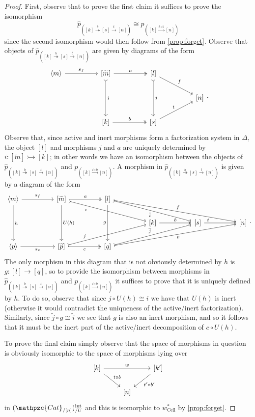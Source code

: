 \documentclass[a4paper, reqno]{amsart}
\theoremstyle{definition}
\newcommand\ccat{\mathpzc{Cat}}
\newcommand\cell{\mathrm{Cell}}
\newcommand\bm{\langle m\rangle}
\newcommand\inrt{\mathrm{int}}
\begin{document}
\begin{proof}
First, observe that to prove the first claim it suffices to prove the isomorphism \[\widehat{p}_{([k]\overset{b}{\twoheadrightarrow}[s]\xrightarrow{t}[n])}\cong p_{([k]\xrightarrow{t\circ b}[n])}\]
since the second isomorphism would then follow from \cref{prop:forget}. Observe that objects of $\widehat{p}_{([k]\overset{b}{\twoheadrightarrow}[s]\xrightarrow{t}[n])}$ are given by diagrams of the form
\[
\begin{tikzcd}[column sep=huge]
\bm\arrow[r, "s_f"]&{[\widetilde{m}]}\arrow[r, two heads, "a"]\arrow[dd, tail, "i"]&{[l]}\arrow[dd, tail, "j"]\arrow[dr, "f"]\\
{}&{}&{}&{[n]}\\
{}&{[k]}\arrow[r, two heads, "b"]&{[s]}\arrow[ur, "t"]
\end{tikzcd}.
\]
Observe that, since active and inert morphisms form a factorization system in $\Delta$,   the object $[l]$ and morphisms $j$ and $a$ are uniquely determined by $i:[\widetilde{m}]\rightarrowtail[k]$; in other words we have an isomorphism between the objects of $\widehat{p}_{([k]\overset{b}{\twoheadrightarrow}[s]\xrightarrow{t}[n])}$ and $p_{([k]\xrightarrow{t\circ b}[n])}$. A morphism in $\widehat{p}_{([k]\overset{b}{\twoheadrightarrow}[s]\xrightarrow{t}[n])}$ is given by a diagram of the form
\[
\begin{tikzcd}[column sep=huge]
\bm\arrow[dd, "h"]\arrow[r, "s_f"]&{[\widetilde{m}]}\arrow[dd, "U(h)"]\arrow[drr, tail, "i" near start, swap]\arrow[r, two heads, "a"]&{[l]}\arrow[dd, "g" swap]\arrow[drr, tail, "\overline{i}" swap]\arrow[drrr, "f"]\\
{}&{}&{}&{[k]}\arrow[r, two heads, "b"]&{[s]}\arrow[r, "t" very near start]&{[n]}\\
\langle p\rangle\arrow[r, "s_v" swap]&{[\widetilde{p}]}\arrow[r, two heads, "c" swap]\arrow[urr, tail, "j" near start]&{[q]}\arrow[urr,tail, "\overline{j}"]\arrow[urrr, "v" swap]
\end{tikzcd}.
\]
The only morphism in this diagram that is not obviously determined by $h$ is $g:[l]\rightarrow[q]$, so to provide the isomorphism between morphisms in $\widehat{p}_{([k]\overset{b}{\twoheadrightarrow}[s]\xrightarrow{t}[n])}$ and $p_{([k]\xrightarrow{t\circ b}[n])}$ it suffices to prove that it is uniquely defined by $h$. To do so, observe that since $j\circ U(h)\cong i$ we have that $U(h)$ is inert (otherwise it would contradict the uniqueness of the active/inert factorization). Similarly, since $\widetilde{j}\circ g\cong \widetilde{i}$ we see that $g$ is also an inert morphism, and so it follows that it must be the inert part of the active/inert decomposition of $c\circ U(h)$.\par
To prove the final claim simply observe that the space of morphisms in question is obviously isomorphic to the space of morphisms lying over 
\[
\begin{tikzcd}
{[k]}\arrow[rr, "w"]\arrow[rd, "t\circ b"]&{}&{[k']}\arrow[ld, "t'\circ b'"]\\
{}&{[n]}
\end{tikzcd}
\]
in $(\ccat_{/[n]})^\inrt_{/U}$ and this is isomorphic to $w^*_\cell$ by \cref{prop:forget}.
\end{proof}
\end{document}
